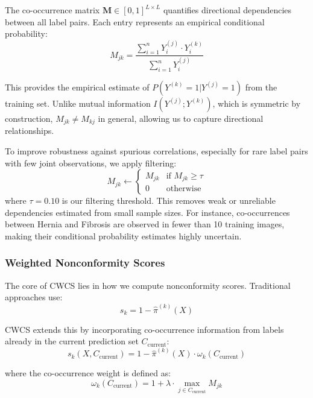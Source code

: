 The co-occurrence matrix $\mathbf{M} \in [0,1]^{L \times L}$ quantifies directional dependencies between all label pairs. Each entry represents an empirical conditional probability:
\begin{equation}
M_{jk} = \frac{\sum_{i=1}^{n} Y_i^{(j)} \cdot Y_i^{(k)}}{\sum_{i=1}^{n} Y_i^{(j)}}
\end{equation}

This provides the empirical estimate of $P(Y^{(k)} = 1 | Y^{(j)} = 1)$ from the training set. Unlike mutual information $I(Y^{(j)}; Y^{(k)})$, which is symmetric by construction, $M_{jk} \neq M_{kj}$ in general, allowing us to capture directional relationships.

To improve robustness against spurious correlations, especially for rare label pairs with few joint observations, we apply filtering:
\begin{equation}
M_{jk} \leftarrow \begin{cases}
M_{jk} & \text{if } M_{jk} \geq \tau \\
0 & \text{otherwise}
\end{cases}
\end{equation}
where $\tau = 0.10$ is our filtering threshold. This removes weak or unreliable dependencies estimated from small sample sizes. For instance, co-occurrences between Hernia and Fibrosis are observed in fewer than 10 training images, making their conditional probability estimates highly uncertain.

\subsubsection{Weighted Nonconformity Scores}

The core of CWCS lies in how we compute nonconformity scores. Traditional approaches use:
\begin{equation}
s_k = 1 - \hat{\pi}^{(k)}(X)
\end{equation}

CWCS extends this by incorporating co-occurrence information from labels already in the current prediction set $C_{\text{current}}$:
\begin{equation}
s_k(X, C_{\text{current}}) = 1 - \hat{\pi}^{(k)}(X) \cdot \omega_k(C_{\text{current}})
\end{equation}

where the co-occurrence weight is defined as:
\begin{equation}
\omega_k(C_{\text{current}}) = 1 + \lambda \cdot \max_{j \in C_{\text{current}}} M_{jk}
\end{equation}

